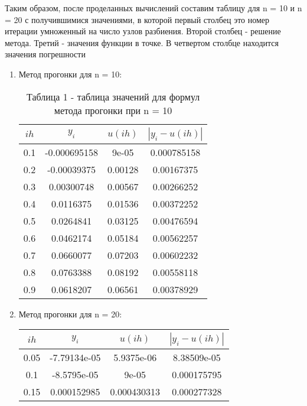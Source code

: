 \documentclass[a4paper,12pt]{article}
\begin{document}
Таким образом, после проделанных вычислений составим таблицу для n = 10 и n = 20 
с получившимися значениями, в которой первый столбец это номер итерации умноженный на число узлов разбиения.
Второй столбец - решение метода. Третий - значения функции в точке. В четвертом столбце находится значения погрешности 
\begin{enumerate}[label = \arabic*.]
    \item {Метод прогонки для n = 10:
        \begin{table}[h]
        \centering
        \begin{tabular}{|c|c|c|c|}
            \hline
            $ih$ & $y_i$ & $u(ih)$ & $\left|y_i-u(ih)\right|$\\ \hline
            0.1 & -0.000695158 &        9e-05 &  0.000785158\\ \hline
            0.2 &  -0.00039375 &      0.00128 &   0.00167375\\ \hline
            0.3 &   0.00300748 &      0.00567 &   0.00266252\\ \hline
            0.4 &    0.0116375 &      0.01536 &   0.00372252\\ \hline
            0.5 &    0.0264841 &      0.03125 &   0.00476594\\ \hline
            0.6 &    0.0462174 &      0.05184 &   0.00562257\\ \hline
            0.7 &    0.0660077 &      0.07203 &   0.00602232\\ \hline
            0.8 &    0.0763388 &      0.08192 &   0.00558118\\ \hline
            0.9 &    0.0618207 &      0.06561 &   0.00378929\\ \hline
        \end{tabular}
        \caption*{\small{Таблица 1 - таблица значений для формул метода прогонки при n = 10}}
        \end{table}
    }
    \item {Метод прогонки для n = 20:
      \begin{table}[h]
      \centering
      \begin{tabular}{|c|c|c|c|}
          \hline
          $ih$ & $y_i$ & $u(ih)$ & $\left|y_i-u(ih)\right|$\\ \hline
          0.05 & -7.79134e-05 &   5.9375e-06 &  8.38509e-05\\ \hline
          0.1 &  -8.5795e-05 &        9e-05 &  0.000175795\\ \hline
          0.15 &  0.000152985 &  0.000430313 &  0.000277328\\ \hline

\end{tabular}
\end{table}}
\end{enumerate}
\end{document}
